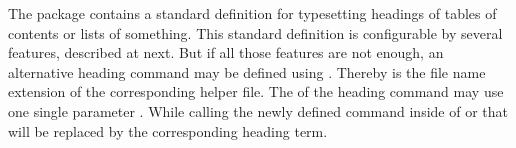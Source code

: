 \begin{Declaration}
\end{Declaration}
%
The package  contains a standard definition for typesetting
headings of tables of contents or lists of something. This standard definition
is configurable by several features, described at  next. But
if all those features are not enough, an alternative heading command may be
defined using . Thereby  is the file
name extension of the corresponding helper file. The  of the
heading command may use one single parameter . While calling the
newly defined command inside of  or 
that  will be replaced by the corresponding heading term.
%

